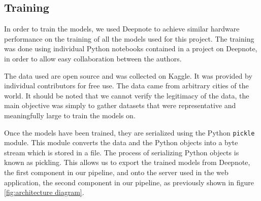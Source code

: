 \subsection{Training}\label{sec:training}
In order to train the models, we used Deepnote\cite{deepnote} to achieve similar hardware performance on the training of all the models used for this project. 
The training was done using individual Python notebooks contained in a project on Deepnote, in order to allow easy collaboration between the authors.

The data used are open source and was collected on Kaggle\cite{kaggle}. It was provided by individual contributors for free use.
The data came from arbitrary cities of the world. 
It should be noted that we cannot verify the legitimacy of the data, the main objective was simply to gather datasets that were representative and meaningfully large to train the models on. 

Once the models have been trained, they are serialized using the Python \texttt{pickle} module.
This module converts the data and the Python objects into a byte stream which is stored in a file.
The process of serializing Python objects is known as pickling. 
This allows us to export the trained models from Deepnote, the first component in our pipeline, and onto the server used in the web application, the second component in our pipeline, as previously shown in figure \ref{fig:architecture diagram}.\cite{pickle_documentation}